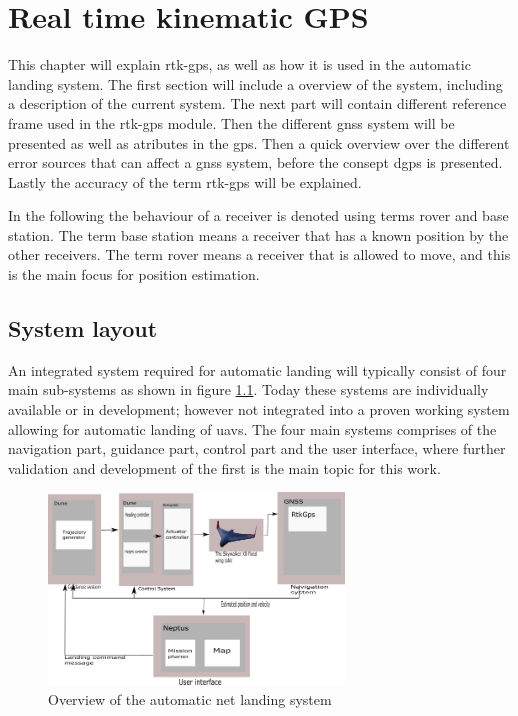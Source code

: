 
\chapter{Real time kinematic GPS}
This chapter will explain \acrfull{rtk-gps}, as well as how it is used in the automatic landing system. The first section will include a overview of the system, including a description of the current system. The next part will contain different reference frame used in the \gls{rtk-gps} module. Then the different \acrfull{gnss} system will be presented as well as atributes in the \acrfull{gps}. Then a quick overview over the different error sources that can affect a \gls{gnss} system, before the consept \acrfull{dgps} is presented. Lastly the accuracy of the term \gls{rtk-gps} will be explained.

In the following the behaviour of a receiver is denoted using terms rover and base station. The term base station means a receiver that has a known position by the other receivers. The term rover means a receiver that is allowed to move, and this is the main focus for position estimation.
\section{System layout}
An integrated system required for automatic landing will typically consist of four main sub-systems as shown in figure \ref{figure:SystemOverview}. Today these systems are individually available or in development; however not integrated into a proven working system allowing for automatic landing of \glspl{uav}. The four main systems comprises of the navigation part, guidance part, control part and the user interface, where further validation and development of the first is the main topic for this work.

\begin{figure}[H]
	\centering
		\includegraphics[width=0.7\textwidth]{figs/SystemOverview.png}
		\caption{Overview of the automatic net landing system}
		\label{figure:SystemOverview}
\end{figure}

